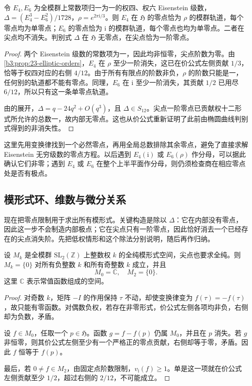 \begin{corollary}\label{b3:cor:23-eisenstein-zeros}
令 \(E_4,E_6\) 为全模群上常数项归一为一的权四、权六 Eisenstein 级数，\(\Delta=(E_4^3-E_6^2)/1728\)，\(\rho=e^{2\pi\mathrm{i}/3}\)。则 \(E_4\) 在 \(\mathfrak H\) 的零点恰为 \(\rho\) 的模群轨道，每个零点均为单零点；\(E_6\) 的零点恰为 \(\mathrm{i}\) 的模群轨道，每个零点也均为单零点。二者在尖点均不消失。判别式 \(\Delta\) 在 \(\mathfrak H\) 无零点，在尖点恰为一阶零点。
\end{corollary}
\begin{proof}
两个 Eisenstein 级数的常数项为一，因此均非恒零，尖点阶数为零。由\cref{b3:prop:23-elliptic-orders}，\(E_4\) 在 \(\rho\) 至少一阶消失，这已在价公式左侧贡献 \(1/3\)，恰等于权四对应的右侧 \(4/12\)。由于所有有限点的阶数非负，\(\rho\) 的阶数只能是一，任何别的轨道都不能有零点。同理，\(E_6\) 在 \(\mathrm{i}\) 至少一阶消失，其贡献 \(1/2\) 已用尽 \(6/12\)，所以只有这一条单零点轨道。

由的展开，\(\Delta=q-24q^2+O(q^3)\)，且 \(\Delta\in S_{12}\)。尖点一阶零点已贡献权十二形式所允许的总数一，故内部无零点。这也从价公式重新证明了此前由椭圆曲线判别式得到的非消失性。
\end{proof}

这里先用变换律找到一个必然零点，再用全局总数排除其余零点，避免了直接求解 Eisenstein 无穷级数的零点方程。以后遇到 \(E_4(\mathrm{i})\) 或 \(E_6(\rho)\) 作分母，可以据此确认它们非零；遇到 \(E_4\) 或 \(E_6\) 在整个上半平面作分母，则仍须检查商在相应零点处是否有极点。

\subsection{模形式环、维数与微分关系}
\label{b3:subsec:230503}

现在把零点限制用于求出所有模形式。关键构造是除以 \(\Delta\)：它在内部没有零点，因此这一步不会制造内部极点；它在尖点只有一阶零点，因此恰好消去一个已经存在的尖点消失阶。先把低权情形和这个除法分别说明，随后再作归纳。

\begin{lemma}[最低权的模形式空间]\label{b3:lem:23-low-weights}
设 \(M_k\) 是全模群 \(\mathrm{SL}_2(\mathbb Z)\) 上整数权 \(k\) 的全纯模形式空间，尖点也要求全纯。则 \(M_k=\{0\}\) 对所有负整数 \(k\) 和所有奇整数 \(k\) 成立，并且
\[
 M_0=\mathbb C,\quad M_2=\{0\}.
\]
这里 \(\mathbb C\) 表示常值函数组成的空间。
\end{lemma}
\begin{proof}
对奇数 \(k\)，矩阵 \(-I\) 的作用保持 \(\tau\) 不动，却使变换律变为 \(f(\tau)=-f(\tau)\)，故只能有零函数。对偶数负权，若存在非零形式，价公式左侧各项均非负，右侧却为负数，矛盾。

设 \(f\in M_0\)，任取一个 \(p\in\mathfrak H\)。函数 \(g=f-f(p)\) 仍属 \(M_0\)，并且在 \(p\) 消失。若 \(g\) 非恒零，则其价公式左侧至少有一个严格正的零点贡献，右侧却等于零，矛盾。因此 \(f\) 恒等于 \(f(p)\)。

最后，若 \(0\ne f\in M_2\)，由固定点阶数限制，\(v_{\mathrm{i}}(f)\ge1\)。单是这一项就在价公式左侧贡献至少 \(1/2\)，超过右侧的 \(2/12\)，不可能成立。
\end{proof}

